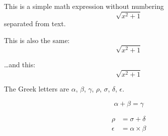 \documentclass{article}
\begin{document}
This is a simple math expression without numbering
\[\sqrt{x^2+1}\] 
separated from text.

This is also the same:
\begin{displaymath}
	\sqrt{x^2+1}
\end{displaymath}

\ldots and this:
\begin{equation*}
	\sqrt{x^2+1}
\end{equation*}

The Greek letters are $\alpha$, $\beta$, $\gamma$, $\rho$, $\sigma$, $\delta$, $\epsilon$.

\[
\alpha + \beta = \gamma
\]

\begin{align*}
	\rho &= \sigma + \delta \\
	\epsilon &= \alpha \times \beta
\end{align*}
\end{document}
